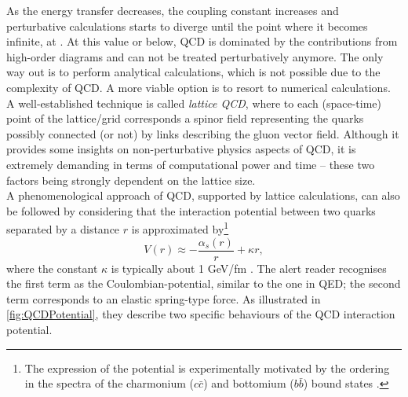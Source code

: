 As the energy transfer decreases, the coupling constant increases and perturbative calculations starts to diverge until the point where it becomes infinite, at \LambdaQCD. At this value or below, QCD is dominated by the contributions from high-order diagrams and can not be treated perturbatively anymore. The only way out is to perform analytical calculations, which is not possible due to the complexity of QCD. A more viable option is to resort to numerical calculations. A well-established technique is called \textit{lattice QCD}, where to each (space-time) point of the lattice/grid corresponds a spinor field representing the quarks possibly connected (or not) by links describing the gluon vector field. Although it provides some insights on non-perturbative physics aspects of QCD, it is extremely demanding in terms of computational power and time -- these two factors being strongly dependent on the lattice size.\\

A phenomenological approach of QCD, supported by lattice calculations, can also be followed by considering that the interaction potential between two quarks separated by a distance $r$ is approximated by\footnote{The expression of the potential is experimentally motivated by the ordering in the spectra of the charmonium ($c\bar{c}$) and bottomium ($b\bar{b}$) bound states \cite{thomsonModernParticlePhysics2013} \cite{martinParticlePhysics2017}.}
\begin{equation}
V(r) \approx - \frac{\alpha_{s}(r)}{r} + \kappa r,
\label{eq:QCDPotential}
\end{equation}
where the constant $\kappa$ is typically about 1 GeV/fm \cite{martinParticlePhysics2017}. The alert reader recognises the first term as the Coulombian-potential, similar to the one in QED; the second term corresponds to an elastic spring-type force. As illustrated in \fig\ref{fig:QCDPotential}, they describe two specific behaviours of the QCD interaction potential.

